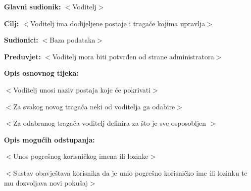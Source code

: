 					
					\noindent {}
					\begin{packed_item}
						
						\item \textbf{Glavni sudionik: }$<$Voditelj$>$
						\item  \textbf{Cilj:} $<$Voditelj ima dodijeljene postaje i tragače kojima upravlja$>$
						\item  \textbf{Sudionici:} $<$Baza podataka$>$
						\item  \textbf{Preduvjet:} $<$Voditelj mora biti potvrđen od strane administratora$>$
						\item  \textbf{Opis osnovnog tijeka:}
						
						\item[] \begin{packed_enum}
							
							\item $<$Voditelj unosi naziv postaja koje će pokrivati$>$
							\item $<$Za svakog novog tragača neki od voditelja ga odabire$>$
							\item $<$Za odabranog tragača voditelj definira za što je sve osposobljen $>$
							
							
						\end{packed_enum}
						
					\end{packed_item}
					
					\item  \textbf{Opis mogućih odstupanja:}
					
					\item[] \begin{packed_item}
						
						\item[2.a] $<$Unos pogrešnog korisničkog imena ili lozinke$>$
						\item[] \begin{packed_enum}
							
							\item $<$Sustav obavještava korisnika da je unio pogrešno korisničko ime ili lozinku te mu dozvoljava novi pokušaj$>$
							
						\end{packed_enum}
						
					\end{packed_item}
					
